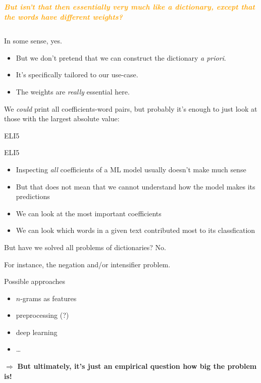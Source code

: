 \documentclass[compress]{beamer}
\newcommand{\question}[1]{
	\begin{frame}[plain]
		\begin{columns}
			\column{.3\textwidth}
			\makebox[\columnwidth]{
				\texttt{[image: mannetje.png]}}
			\column{.7\textwidth}
			\large
			\textcolor{orange}{\textbf{\emph{#1}}}
		\end{columns}
\end{frame}}
\begin{document}
\question{But isn't that then essentially very much like a dictionary, except that the words have different weights?}


\begin{frame}{In some sense, yes.}
	\begin{itemize}
		\item But we don't pretend that we can construct the dictionary \emph{a priori}.
		\item It's specifically tailored to our use-case.
		\item The weights are \emph{really} essential here.
	\end{itemize}
	
	\pause
	We \emph{could} print all coefficients-word pairs, but probably it's enough to just look at those with the largest absolute value:
\end{frame}





\begin{frame}{ELI5}
\end{frame}

\begin{frame}{ELI5}
	\begin{itemize}
		\item Inspecting \emph{all} coefficients of a ML model usually doesn't make much sense
		\item But that does not mean that we cannot understand how the model makes its predictions
		\item We can look at the most important coefficients
		\item We can look which words in a given text contributed most to its classfication
	\end{itemize}
\end{frame}




\begin{frame}{But have we solved all problems of dictionaries?}
	No.
	
	For instance, the negation and/or intensifier problem.
	
	Possible approaches
	\begin{itemize}
		\item $n$-grams as features
		\item preprocessing (?)
		\item deep learning 
		\item \ldots
	\end{itemize}
	\pause
	
	$\Rightarrow$ \textbf{But ultimately, it's just an empirical question how big the problem is!}
	
	
\end{frame}
\end{document}
